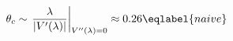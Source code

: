 \begin{equation}
\theta_c \sim \left.\frac{\lambda}{|V'(\lambda)|}
\right|_{V''(\lambda)=0}
\approx 0.26
\eqlabel{naive}
\end{equation}

